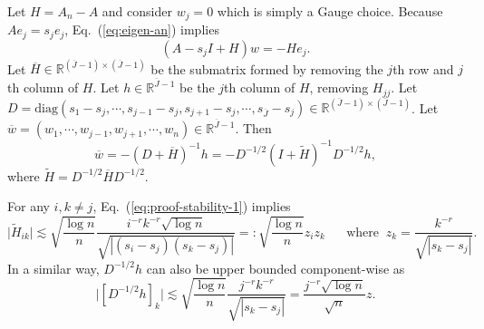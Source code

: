 \documentclass[11pt,a4paper]{article}
\renewcommand{\tilde}{\widetilde}
\renewcommand{\bar}{\overline}
\theoremstyle{definition}
\theoremstyle{plain}
\theoremstyle{remark}
\newcommand{\diag}{\mathrm{diag}}
\begin{document}
Let $H=A_n-A$ and consider $w_j=0$ which is simply a Gauge choice. Because $Ae_j=s_je_j$, Eq.~(\ref{eq:eigen-an}) implies
$$
(A-s_j I+H)w = -He_j.
$$
Let $\bar H\in\mathbb R^{(\bar J-1)\times (\bar J-1)}$ be the submatrix formed by removing the $j$th row and $j$th column of $H$. Let $h\in\mathbb R^{\bar J-1}$ be the $j$th column of $H$, removing $H_{jj}$.
Let $D=\diag(s_1-s_j,\cdots,s_{j-1}-s_j,s_{j+1}-s_j,\cdots,s_{\bar J}-s_j)\in\mathbb R^{(\bar J-1)\times(\bar J-1)}$. Let $\bar w=(w_1,\cdots,w_{j-1},w_{j+1},\cdots,w_n)\in\mathbb R^{\bar J-1}$. Then
$$
\bar w = -(D+\bar H)^{-1}h = -D^{-1/2}(I+\tilde H)^{-1}D^{-1/2}h,
$$
where $\tilde H = D^{-1/2} \bar H D^{-1/2}$. 

For any $i,k\neq j$, Eq.~(\ref{eq:proof-stability-1}) implies
$$
\big|\tilde H_{ik}\big| \lesssim \sqrt{\frac{\log n}{n}} \frac{i^{-r}k^{-r}\sqrt{\log n}}{\sqrt{|(s_i-s_j)(s_k-s_j)|}} =: \sqrt{\frac{\log n}{n}}z_iz_k\;\;\;\;\;\;\text{where}\;\; z_k = \frac{k^{-r}}{\sqrt{|s_k-s_j|}}.
$$
In a similar way, $D^{-1/2}h$ can also be upper bounded component-wise as
\begin{equation}
\big|[D^{-1/2}h]_k \big| \lesssim  \sqrt{\frac{\log n}{n}}\frac{j^{-r}k^{-r}}{\sqrt{|s_k-s_j|}} = \frac{j^{-r}\sqrt{\log n}}{\sqrt{n}}z.
\label{eq:proof-stability-3}
\end{equation}
\end{document}
